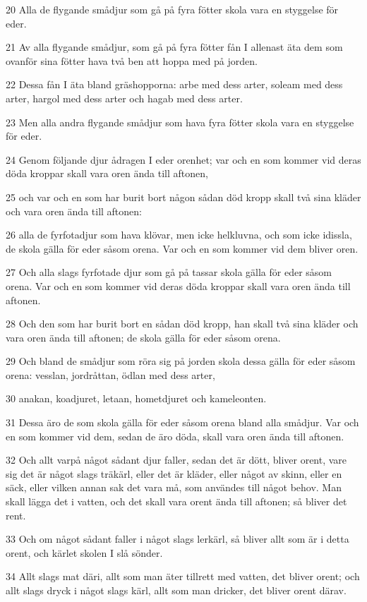 \par 20 Alla de flygande smådjur som gå på fyra fötter skola vara en styggelse för eder.
\par 21 Av alla flygande smådjur, som gå på fyra fötter fån I allenast äta dem som ovanför sina fötter hava två ben att hoppa med på jorden.
\par 22 Dessa fån I äta bland gräshopporna: arbe med dess arter, soleam med dess arter, hargol med dess arter och hagab med dess arter.
\par 23 Men alla andra flygande smådjur som hava fyra fötter skola vara en styggelse för eder.
\par 24 Genom följande djur ådragen I eder orenhet; var och en som kommer vid deras döda kroppar skall vara oren ända till aftonen,
\par 25 och var och en som har burit bort någon sådan död kropp skall två sina kläder och vara oren ända till aftonen:
\par 26 alla de fyrfotadjur som hava klövar, men icke helkluvna, och som icke idissla, de skola gälla för eder såsom orena. Var och en som kommer vid dem bliver oren.
\par 27 Och alla slags fyrfotade djur som gå på tassar skola gälla för eder såsom orena. Var och en som kommer vid deras döda kroppar skall vara oren ända till aftonen.
\par 28 Och den som har burit bort en sådan död kropp, han skall två sina kläder och vara oren ända till aftonen; de skola gälla för eder såsom orena.
\par 29 Och bland de smådjur som röra sig på jorden skola dessa gälla för eder såsom orena: vesslan, jordråttan, ödlan med dess arter,
\par 30 anakan, koadjuret, letaan, hometdjuret och kameleonten.
\par 31 Dessa äro de som skola gälla för eder såsom orena bland alla smådjur. Var och en som kommer vid dem, sedan de äro döda, skall vara oren ända till aftonen.
\par 32 Och allt varpå något sådant djur faller, sedan det är dött, bliver orent, vare sig det är något slags träkärl, eller det är kläder, eller något av skinn, eller en säck, eller vilken annan sak det vara må, som användes till något behov. Man skall lägga det i vatten, och det skall vara orent ända till aftonen; så bliver det rent.
\par 33 Och om något sådant faller i något slags lerkärl, så bliver allt som är i detta orent, och kärlet skolen I slå sönder.
\par 34 Allt slags mat däri, allt som man äter tillrett med vatten, det bliver orent; och allt slags dryck i något slags kärl, allt som man dricker, det bliver orent därav.
